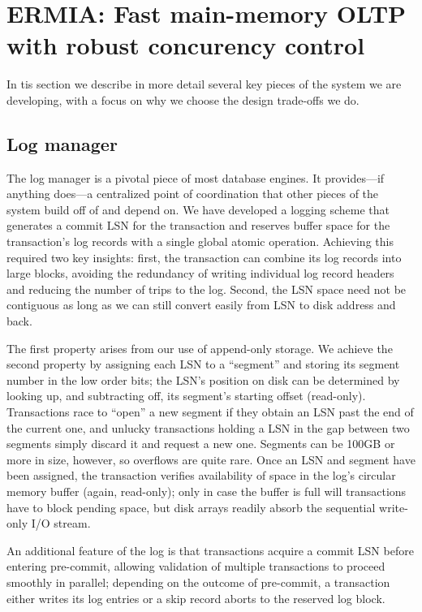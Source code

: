 
\section{ERMIA: Fast main-memory OLTP with robust concurency control}

In tis section we describe in more detail several key pieces of the system we are developing, with a focus on why we choose the design trade-offs we do.

\subsection{Log manager}

The log manager is a pivotal piece of most database engines. It provides---if anything does---a centralized point of coordination that other pieces of the system build off of and depend on. We have developed a logging scheme that  generates a commit LSN for the transaction and reserves buffer space for the transaction's log records with a single global atomic operation. Achieving this required two key insights: first, the transaction can combine its log records into large blocks, avoiding the redundancy of writing individual log record headers and reducing the number of trips to the log. Second, the LSN space need not be contiguous as long as we can still convert easily from LSN to disk address and back.

The first property arises from our use of append-only storage. We achieve the second property by assigning each LSN to a ``segment'' and storing its segment number in the low order bits; the LSN's position on disk can be determined by looking up, and subtracting off, its segment's starting offset (read-only). Transactions race to ``open'' a new segment if they obtain an LSN past the end of the current one, and unlucky transactions holding a LSN in the gap between two segments simply discard it and request a new one. Segments can be 100GB or more in size, however, so overflows are quite rare. Once an LSN and segment have been assigned, the transaction verifies availability of space in the log's circular memory buffer (again, read-only); only in case the buffer is full will transactions have to block pending space, but disk arrays readily absorb the sequential write-only I/O stream.

An additional feature of the log is that transactions acquire a commit LSN before entering pre-commit, allowing validation of multiple transactions to proceed smoothly in parallel; depending on the outcome of pre-commit, a transaction either writes its log entries or a skip record aborts to the reserved log block.


